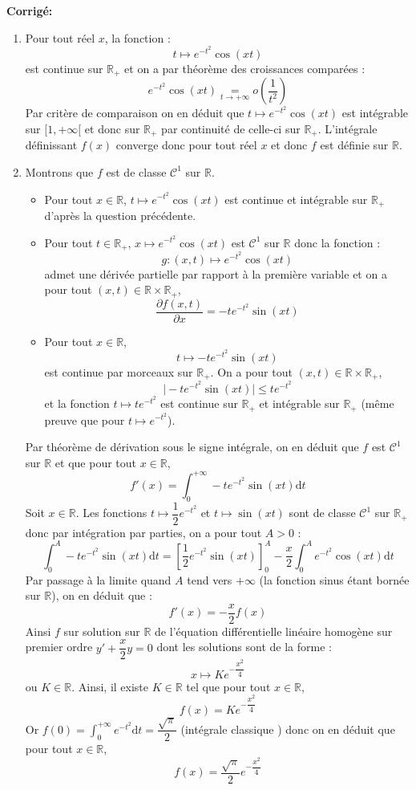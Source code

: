 \documentclass[a4paper,twoside,french,11pt]{VcCours}
\newcommand{\dt}{\text{d}t}
\newcommand{\corr}{\textbf{Corrigé:}}
\begin{document}
\corr \begin{enumerate}
\item Pour tout réel $x$, la fonction :
$$t \mapsto e^{-t^2} \cos(xt)$$
est continue sur $\mathbb{R}_+$ et on a par théorème des croissances comparées :
$$ e^{-t^2} \cos(xt)  \underset{t \rightarrow + \infty}{=} o \left( \dfrac{1}{t^2} \right)$$
Par critère de comparaison on en déduit que $t \mapsto e^{-t^2} \cos(xt)$ est intégrable sur $[1, + \infty[$ et donc sur $\mathbb{R}_+$ par continuité de celle-ci sur $\mathbb{R}_+$. L'intégrale définissant $f(x)$ converge donc pour tout réel $x$ et donc $f$ est définie sur $\mathbb{R}$.

\item Montrons que $f$ est de classe $\mathcal{C}^1$ sur $\mathbb{R}$.
\begin{itemize}
\item Pour tout $x \in \mathbb{R}$, $t \mapsto e^{-t^2} \cos(xt)$ est continue et intégrable sur $\mathbb{R}_+$ d'après la question précédente.
\item Pour tout $t \in \mathbb{R}_+$, $x \mapsto e^{-t^2} \cos(xt)$ est $\mathcal{C}^1$ sur $\mathbb{R}$ donc la fonction :
$$g: (x,t) \mapsto e^{-t^2} \cos(xt)$$
admet une dérivée partielle par rapport à la première variable et on a pour tout $(x,t) \in \mathbb{R} \times \mathbb{R}_+$,
$$ \dfrac{\partial f (x,t)}{\partial x} = -t e^{-t^2} \sin(xt)$$
\item Pour tout $x \in \mathbb{R}$,
$$ t \mapsto -t e^{-t^2} \sin(xt)$$
est continue par morceaux sur $\mathbb{R}_{+}$. On a pour tout $(x,t) \in \mathbb{R} \times \mathbb{R}_+$,
$$ \vert  -t e^{-t^2} \sin(xt) \vert \leq t e^{-t^2} $$
et la fonction $t \mapsto t e^{-t^2}$ est continue sur $\mathbb{R}_+$ et intégrable sur $\mathbb{R}_+$ (même preuve que pour $t \mapsto e^{-t^2}$).
\end{itemize}
Par théorème de dérivation sous le signe intégrale, on en déduit que $f$ est $\mathcal{C}^1$ sur $\mathbb{R}$ et que pour tout $x \in \mathbb{R}$,
$$f'(x) =  \int_{0}^{+ \infty} -t e^{-t^2} \sin(xt) \dt$$
Soit $x \in \mathbb{R}$. Les fonctions $t \mapsto \dfrac{1}{2} e^{-t^2}$ et $t \mapsto \sin(xt)$ sont de classe $\mathcal{C}^1$ sur $\mathbb{R}_+$ donc par intégration par parties, on a pour tout $A>0$ :
$$ \int_{0}^{A}  -t e^{-t^2} \sin(xt) \dt = \left[\dfrac{1}{2} e^{-t^2}  \sin(xt) \right]_0^A - \dfrac{x}{2} \int_{0}^A e^{-t^2} \cos(xt) \dt$$ 
Par passage à la limite quand $A$ tend vers $+ \infty$ (la fonction sinus étant bornée sur $\mathbb{R}$), on en déduit que :
$$ f'(x) = - \dfrac{x}{2} f(x)$$
Ainsi $f$ sur solution sur $\mathbb{R}$ de l'équation différentielle linéaire homogène sur premier ordre $y'+ \dfrac{x}{2}y=0$ dont les solutions sont de la forme :
$$ x \mapsto K e^{- \dfrac{x^2}{4}}$$
ou $K \in \mathbb{R}$. Ainsi, il existe $K \in \mathbb{R}$ tel que pour tout $x \in \mathbb{R}$,
$$ f(x) = Ke^{- \dfrac{x^2}{4}}$$
Or $f(0)= \int_{0}^{+ \infty} e^{-t^2} \dt = \dfrac{\sqrt{\pi}}{2}$ (intégrale \og classique \fg) donc on en déduit que pour tout $x \in \mathbb{R}$,
$$ f(x) = \dfrac{\sqrt{\pi}}{2 } e^{- \dfrac{x^2}{4}}$$
\end{enumerate}
\end{document}
